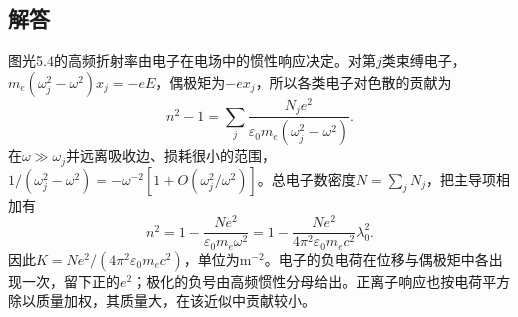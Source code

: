 \documentclass[UTF8,fontset=fandol,a4paper,11pt]{ctexart}
\begin{document}
\subsection*{解答}


图光5.4的高频折射率由电子在电场中的惯性响应决定。对第$j$类束缚电子，$m_e(\omega_j^2-\omega^2)x_j=-eE$，偶极矩为$-ex_j$，所以各类电子对色散的贡献为
\[
n^2-1=\sum_j\frac{N_je^2}{\varepsilon_0m_e(\omega_j^2-\omega^2)}.
\]
在$\omega\gg\omega_j$并远离吸收边、损耗很小的范围，$1/(\omega_j^2-\omega^2)=-\omega^{-2}[1+O(\omega_j^2/\omega^2)]$。总电子数密度$N=\sum_jN_j$，把主导项相加有
\[
n^2=1-\frac{Ne^2}{\varepsilon_0m_e\omega^2}
=1-\frac{Ne^2}{4\pi^2\varepsilon_0m_ec^2}\lambda_0^2.
\]
因此$K=Ne^2/(4\pi^2\varepsilon_0m_ec^2)$，单位为$\mathrm{m^{-2}}$。电子的负电荷在位移与偶极矩中各出现一次，留下正的$e^2$；极化的负号由高频惯性分母给出。正离子响应也按电荷平方除以质量加权，其质量大，在该近似中贡献较小。
\end{document}
